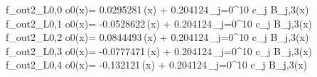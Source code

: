 f_{out2_L0,0	o0}(x)= 0.0295281\,\phi(x) + 0.204124\,\sum_{j=0}^{10} c_j B_{j,3}(x)
f_{out2_L0,1	o0}(x)= -0.0528622\,\phi(x) + 0.204124\,\sum_{j=0}^{10} c_j B_{j,3}(x)
f_{out2_L0,2	o0}(x)= 0.0844493\,\phi(x) + 0.204124\,\sum_{j=0}^{10} c_j B_{j,3}(x)
f_{out2_L0,3	o0}(x)= -0.0777471\,\phi(x) + 0.204124\,\sum_{j=0}^{10} c_j B_{j,3}(x)
f_{out2_L0,4	o0}(x)= -0.132121\,\phi(x) + 0.204124\,\sum_{j=0}^{10} c_j B_{j,3}(x)
